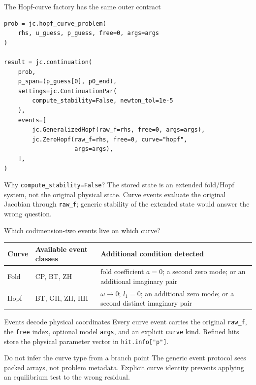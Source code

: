 \begin{frame}[fragile]{The Hopf-curve factory has the same outer contract}
\small
\begin{lstlisting}
prob = jc.hopf_curve_problem(
    rhs, u_guess, p_guess, free=0, args=args
)

result = jc.continuation(
    prob,
    p_span=(p_guess[0], p0_end),
    settings=jc.ContinuationPar(
        compute_stability=False, newton_tol=1e-5
    ),
    events=[
        jc.GeneralizedHopf(raw_f=rhs, free=0, args=args),
        jc.ZeroHopf(raw_f=rhs, free=0, curve="hopf",
                    args=args),
    ],
)
\end{lstlisting}
\begin{alertblock}{Why \texttt{compute\_stability=False}?}
The stored state is an extended fold/Hopf system, not the original physical
state. Curve events evaluate the original Jacobian through \texttt{raw\_f};
generic stability of the extended state would answer the wrong question.
\end{alertblock}
\end{frame}

\begin{frame}{Which codimension-two events live on which curve?}
\small
\centering
\renewcommand{\arraystretch}{1.25}
\begin{tabular}{p{}p{}p{}}
\toprule
Curve & Available event classes & Additional condition detected \\
\midrule
Fold & CP, BT, ZH & fold coefficient $a=0$; a second zero mode; or an
additional imaginary pair \\
Hopf & BT, GH, ZH, HH & $\omega\to0$; $l_1=0$; an additional zero mode; or a
second distinct imaginary pair \\
\bottomrule
\end{tabular}
\vspace{4mm}
\begin{block}{Events decode physical coordinates}
Every curve event carries the original \texttt{raw\_f}, the \texttt{free}
index, optional model \texttt{args}, and an explicit \texttt{curve} kind.
Refined hits store the physical parameter vector in \texttt{hit.info["p"]}.
\end{block}
\begin{alertblock}{Do not infer the curve type from a branch point}
The generic event protocol sees packed arrays, not problem metadata. Explicit
curve identity prevents applying an equilibrium test to the wrong residual.
\end{alertblock}
\end{frame}

